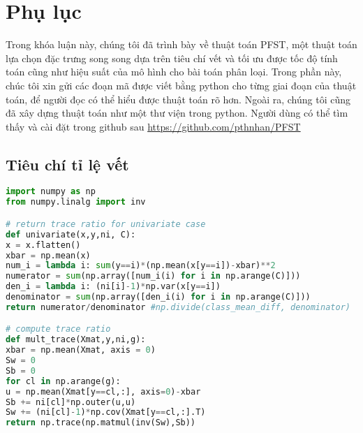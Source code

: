 \chapter*{Phụ lục}

Trong khóa luận này, chúng tôi đã trình bày về thuật toán PFST, một thuật toán lựa chọn đặc trưng song song dựa trên tiêu chí vết và tối ưu được tốc độ tính toán cũng như hiệu suất của mô hình cho bài toán phân loại. Trong phần này, chúc tôi xin gửi các đoạn mã được viết bằng python cho từng giai đoạn của thuật toán, để người đọc có thể hiểu được thuật toán rõ hơn. Ngoài ra, chúng tôi cũng đã xây dựng thuật toán như một thư viện trong python. Người dùng có thể tìm thấy và cài đặt trong github sau \url{https://github.com/pthnhan/PFST}

\section*{Tiêu chí tỉ lệ vết}
\begin{lstlisting}[language=Python]
import numpy as np
from numpy.linalg import inv

# return trace ratio for univariate case
def univariate(x,y,ni, C):
x = x.flatten()
xbar = np.mean(x)
num_i = lambda i: sum(y==i)*(np.mean(x[y==i])-xbar)**2
numerator = sum(np.array([num_i(i) for i in np.arange(C)]))
den_i = lambda i: (ni[i]-1)*np.var(x[y==i])
denominator = sum(np.array([den_i(i) for i in np.arange(C)]))
return numerator/denominator #np.divide(class_mean_diff, denominator)

# compute trace ratio
def mult_trace(Xmat,y,ni,g):
xbar = np.mean(Xmat, axis = 0)
Sw = 0
Sb = 0
for cl in np.arange(g):
u = np.mean(Xmat[y==cl,:], axis=0)-xbar
Sb += ni[cl]*np.outer(u,u)
Sw += (ni[cl]-1)*np.cov(Xmat[y==cl,:].T)
return np.trace(np.matmul(inv(Sw),Sb))
\end{lstlisting}
